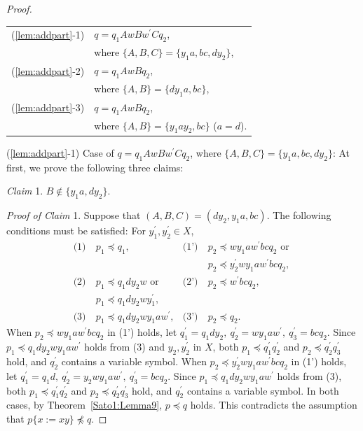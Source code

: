 \begin{proof}
\smallskip

  \begin{tabular}{ll}
  (\ref{lem:addpart}-1) & $q=q_{1}AwBw^{\prime}Cq_{2}$,\\
  & where $\{ A,B,C \} = \{ y_{1}a,bc,dy_{2} \}$,\\
  (\ref{lem:addpart}-2) & $q=q_{1}AwBq_{2}$,\\
  & where $\{ A,B \} = \{ dy_{1}a,bc \}$,\\
  (\ref{lem:addpart}-3) & $q=q_{1}AwBq_{2}$,\\
  & where $\{ A,B \} = \{ y_{1}ay_{2},bc \}$ ($a = d$).
  \end{tabular}
  
  \smallskip

  \noindent
  (\ref{lem:addpart}-1) Case of $q=q_{1}AwBw^{\prime}Cq_{2}$, where $\{ A,B,C \} = \{ y_{1}a,bc,dy_{2} \}$:
  At first, we prove the following three claims:

  \smallskip

  \noindent
  \textit{Claim} 1. $B \not\in \{y_{1}a, dy_{2}\}$.

  \smallskip
  \noindent
  \textit{Proof of Claim} 1.
  Suppose that $(A, B, C) = (dy_{2}, y_{1}a, bc)$. The following conditions must be satisfied: For $y_{1}^{\prime},y_{2}^{\prime}\in X$, 
  \begin{align*}
    \textrm{(1)}~& p_{1} \preceq q_{1}, & \textrm{(1')}~& p_{2} \preceq wy_{1}aw^{\prime}bcq_{2}\mbox{ or } \\
    & & & p_{2} \preceq y_{2}^{\prime}wy_{1}aw^{\prime}bcq_{2},\\
    \textrm{(2)}~& p_{1} \preceq q_{1}dy_{2}w\mbox{ or }  & \textrm{(2')}~& p_{2} \preceq w^{\prime}bcq_{2},\\
    & p_{1} \preceq q_{1}dy_{2}wy_{1}^{\prime}, & & \\
    \textrm{(3)}~& p_{1} \preceq q_{1}dy_{2}wy_{1}aw^{\prime}, & \textrm{(3')}~& p_{2} \preceq q_{2}.
  \end{align*}
  When $p_{2} \preceq wy_{1}aw^{\prime}bcq_{2}$ in (1') holds, let $q^{\prime}_{1}=q_{1}dy_{2},~q^{\prime}_{2}=wy_{1}aw^{\prime},~q^{\prime}_{3}=bcq_{2}$.
  Since $p_{1} \preceq q_{1}dy_{2}wy_{1}aw^{\prime}$ holds from (3) {\color{red} and $y_{2},y^{\prime}_{2}$ in $X$}, both $p_{1} \preceq q^{\prime}_{1}q^{\prime}_{2}$ and $p_{2} \preceq q^{\prime}_{2}q^{\prime}_{3}$ hold, and $q_{2}^{\prime}$ contains a variable symbol.
  When $p_{2} \preceq y_{2}^{\prime}wy_{1}aw^{\prime}bcq_{2}$ in (1') holds, let $q^{\prime}_{1}=q_{1}d,~q^{\prime}_{2}=y_{2}wy_{1}aw^{\prime},~q^{\prime}_{3}=bcq_{2}$.
  Since $p_{1} \preceq q_{1}dy_{2}wy_{1}aw^{\prime}$ holds from (3), both $p_{1} \preceq q^{\prime}_{1}q^{\prime}_{2}$ and $p_{2} \preceq q^{\prime}_{2}q^{\prime}_{3}$ hold, and $q_{2}^{\prime}$ contains a variable symbol.
  In both cases, by Theorem~\ref{Sato1:Lemma9}, $p \preceq q$ holds.
  This contradicts the assumption that $p \{ x := xy \} \not \preceq q$.


\end{proof}
